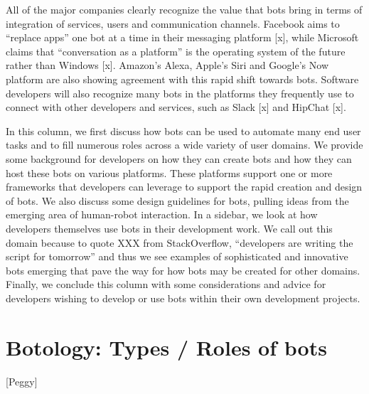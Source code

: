 \documentclass{sig-alternate}
\begin{document}
All of the major companies clearly recognize the value that bots bring in terms of integration of services, users and communication channels. Facebook aims to ``replace apps'' one bot at a time in their messaging platform [x], while Microsoft claims that ``conversation as a platform'' is the operating system of the future rather than Windows [x]. 
Amazon's Alexa, Apple's Siri and Google's Now platform are also showing agreement with this rapid shift towards bots.
Software developers will also recognize many bots in the platforms they frequently use to connect with other developers and services, such as Slack [x] and HipChat [x]. 

In this column, we first discuss how bots can be used to automate many end user tasks and to fill numerous roles across a wide variety of user domains.  
We provide some background for developers on how they can create bots and how they can host these bots on various platforms. These platforms support one or more frameworks that developers can leverage to support the rapid creation and design of bots. We also discuss some design guidelines for bots, pulling ideas from the emerging area of human-robot interaction. 
In a sidebar, we look at how developers themselves use bots in their development work.  We call out this domain because to quote XXX from StackOverflow, ``developers are writing the script for tomorrow'' and thus we see examples of sophisticated and innovative bots emerging that pave the way for how bots may be created for other domains.
Finally, we conclude this column with some considerations and advice for developers wishing to develop or use bots within their own development projects.   


 
	

	
	
%	

\section{Botology: Types / Roles of bots}

[Peggy]
\end{document}
